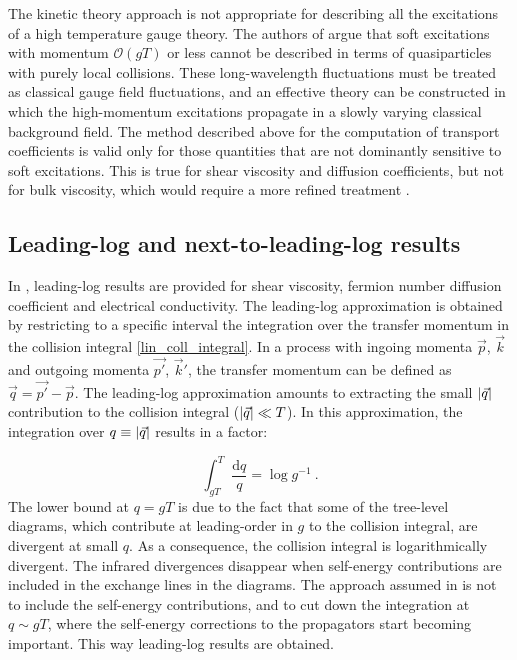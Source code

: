 The kinetic theory approach is not appropriate for describing all the excitations of a high temperature gauge theory. The authors of \cite{Arnold:2000dr,Arnold:2003zc} argue that soft excitations with momentum $\mathcal O(gT)$ or less cannot be described in terms of quasiparticles with purely local collisions. These long-wavelength fluctuations must be treated as classical gauge field fluctuations, and an effective theory can be constructed in which the high-momentum excitations propagate in a slowly varying classical background field. The method described above for the computation of transport coefficients is valid only for those quantities that are not dominantly sensitive to soft excitations. This is true for shear viscosity and diffusion coefficients, but not for bulk viscosity, which would require a more refined treatment \cite{Arnold:2000dr}.

 
\subsection{Leading-log and next-to-leading-log results}

In \cite{Arnold:2000dr}, leading-log results are provided for shear viscosity, fermion number diffusion coefficient and electrical conductivity. The leading-log approximation is obtained by restricting to a specific interval the integration over the transfer momentum in the collision integral \ref{lin_coll_integral}. In a process with ingoing momenta $\vec p$, $\vec k$ and outgoing momenta $\vec{p'}$, $\vec k'$, the transfer momentum can be defined as $\vec q = \vec{p'} - \vec p$. The leading-log approximation amounts to extracting the small $\abs{\vec q}$ contribution to the collision integral ($\abs{\vec q} \ll T$). In this approximation, the integration over $q \equiv \abs{\vec q}$ results in a factor:

\begin{equation}
\int_{gT}^T \frac{\mathrm d q}{q} = \log g^{-1} \: .
\end{equation}
%
The lower bound at $q = gT$ is due to the fact that some of the tree-level diagrams, which contribute at leading-order in $g$ to the collision integral, are divergent at small $q$. As a consequence, the collision integral is logarithmically divergent. The infrared divergences disappear when self-energy contributions are included in the exchange lines in the diagrams. The approach assumed in \cite{Arnold:2000dr} is not to include the self-energy contributions, and to cut down the integration at $q \sim gT$, where the self-energy corrections to the propagators start becoming important. This way leading-log results are obtained.

